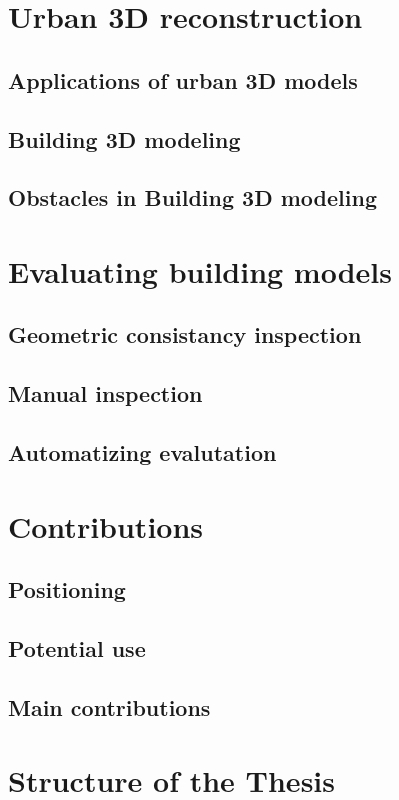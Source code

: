 \minitoc
\section{Urban 3D reconstruction}
    \subsection{Applications of urban 3D models}
    \subsection{Building 3D modeling}
    \subsection{Obstacles in Building 3D modeling}
\section{Evaluating building models}
    \subsection{Geometric consistancy inspection}
    \subsection{Manual inspection}
    \subsection{Automatizing evalutation}
\section{Contributions}
    \subsection{Positioning}
    \subsection{Potential use}
    \subsection{Main contributions}
\section{Structure of the Thesis}


